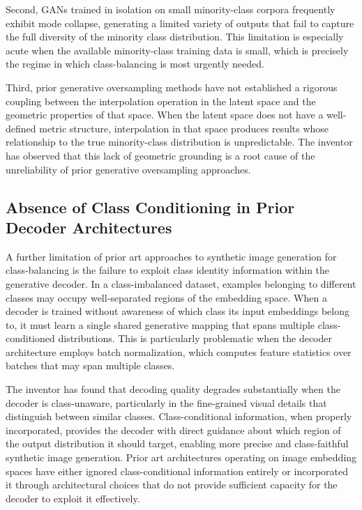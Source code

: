 \documentclass[12pt,letterpaper]{article}
\begin{document}
Second, GANs trained in isolation on small minority-class corpora frequently
exhibit mode collapse, generating a limited variety of outputs that fail to
capture the full diversity of the minority class distribution.  This
limitation is especially acute when the available minority-class training data
is small, which is precisely the regime in which class-balancing is most
urgently needed.

Third, prior generative oversampling methods have not established a rigorous
coupling between the interpolation operation in the latent space and the
geometric properties of that space.  When the latent space does not have a
well-defined metric structure, interpolation in that space produces results
whose relationship to the true minority-class distribution is unpredictable.
The inventor has observed that this lack of geometric grounding is a root
cause of the unreliability of prior generative oversampling approaches.

\subsection{Absence of Class Conditioning in Prior Decoder Architectures}

A further limitation of prior art approaches to synthetic image generation for
class-balancing is the failure to exploit class identity information within
the generative decoder.  In a class-imbalanced dataset, examples belonging to
different classes may occupy well-separated regions of the embedding space.
When a decoder is trained without awareness of which class its input
embeddings belong to, it must learn a single shared generative mapping that
spans multiple class-conditioned distributions.  This is particularly
problematic when the decoder architecture employs batch normalization, which
computes feature statistics over batches that may span multiple classes.

The inventor has found that decoding quality degrades substantially when the
decoder is class-unaware, particularly in the fine-grained visual details that
distinguish between similar classes.  Class-conditional information, when
properly incorporated, provides the decoder with direct guidance about which
region of the output distribution it should target, enabling more precise and
class-faithful synthetic image generation.  Prior art architectures operating
on image embedding spaces have either ignored class-conditional information
entirely or incorporated it through architectural choices that do not provide
sufficient capacity for the decoder to exploit it effectively.
\end{document}
